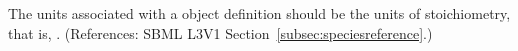 The units associated with a \SpeciesReference object definition should be
the units of stoichiometry, that is, .  (References:
SBML L3V1 Section~\ref{subsec:speciesreference}.)
